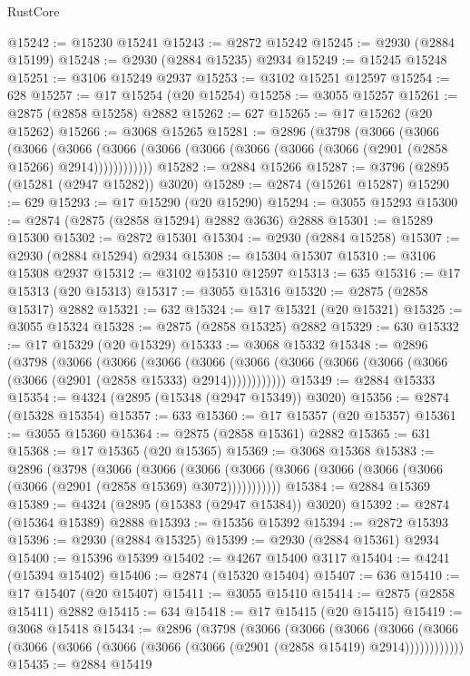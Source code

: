 \begin{lexlean}{RustCore}
\begin{coremodule}
@15242 := @15230 @15241
@15243 := @2872 @15242
@15245 := @2930 (@2884 @15199)
@15248 := @2930 (@2884 @15235) @2934
@15249 := @15245 @15248
@15251 := @3106 @15249 @2937
@15253 := @3102 @15251 @12597
@15254 := 628
@15257 := @17 @15254 (@20 @15254)
@15258 := @3055 @15257
@15261 := @2875 (@2858 @15258) @2882
@15262 := 627
@15265 := @17 @15262 (@20 @15262)
@15266 := @3068 @15265
@15281 := @2896
    (@3798
      (@3066
        (@3066
          (@3066
            (@3066 (@3066 (@3066 (@3066 (@3066 (@3066 (@3066 (@2901 (@2858 @15266) @2914))))))))))))
@15282 := @2884 @15266
@15287 := @3796 (@2895 (@15281 (@2947 @15282)) @3020)
@15289 := @2874 (@15261 @15287)
@15290 := 629
@15293 := @17 @15290 (@20 @15290)
@15294 := @3055 @15293
@15300 := @2874 (@2875 (@2858 @15294) @2882 @3636) @2888
@15301 := @15289 @15300
@15302 := @2872 @15301
@15304 := @2930 (@2884 @15258)
@15307 := @2930 (@2884 @15294) @2934
@15308 := @15304 @15307
@15310 := @3106 @15308 @2937
@15312 := @3102 @15310 @12597
@15313 := 635
@15316 := @17 @15313 (@20 @15313)
@15317 := @3055 @15316
@15320 := @2875 (@2858 @15317) @2882
@15321 := 632
@15324 := @17 @15321 (@20 @15321)
@15325 := @3055 @15324
@15328 := @2875 (@2858 @15325) @2882
@15329 := 630
@15332 := @17 @15329 (@20 @15329)
@15333 := @3068 @15332
@15348 := @2896
    (@3798
      (@3066
        (@3066
          (@3066
            (@3066 (@3066 (@3066 (@3066 (@3066 (@3066 (@3066 (@2901 (@2858 @15333) @2914))))))))))))
@15349 := @2884 @15333
@15354 := @4324 (@2895 (@15348 (@2947 @15349)) @3020)
@15356 := @2874 (@15328 @15354)
@15357 := 633
@15360 := @17 @15357 (@20 @15357)
@15361 := @3055 @15360
@15364 := @2875 (@2858 @15361) @2882
@15365 := 631
@15368 := @17 @15365 (@20 @15365)
@15369 := @3068 @15368
@15383 := @2896
    (@3798
      (@3066
        (@3066
          (@3066 (@3066 (@3066 (@3066 (@3066 (@3066 (@3066 (@2901 (@2858 @15369) @3072)))))))))))
@15384 := @2884 @15369
@15389 := @4324 (@2895 (@15383 (@2947 @15384)) @3020)
@15392 := @2874 (@15364 @15389) @2888
@15393 := @15356 @15392
@15394 := @2872 @15393
@15396 := @2930 (@2884 @15325)
@15399 := @2930 (@2884 @15361) @2934
@15400 := @15396 @15399
@15402 := @4267 @15400 @3117
@15404 := @4241 (@15394 @15402)
@15406 := @2874 (@15320 @15404)
@15407 := 636
@15410 := @17 @15407 (@20 @15407)
@15411 := @3055 @15410
@15414 := @2875 (@2858 @15411) @2882
@15415 := 634
@15418 := @17 @15415 (@20 @15415)
@15419 := @3068 @15418
@15434 := @2896
    (@3798
      (@3066
        (@3066
          (@3066
            (@3066 (@3066 (@3066 (@3066 (@3066 (@3066 (@3066 (@2901 (@2858 @15419) @2914))))))))))))
@15435 := @2884 @15419

\end{coremodule}
\end{lexlean}
